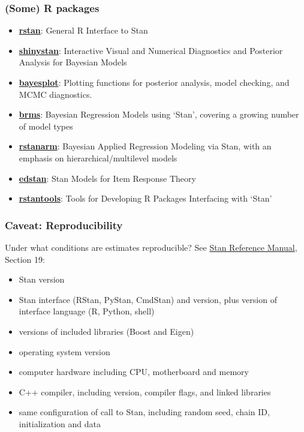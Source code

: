\documentclass[
  11pt,
]{article}
\providecommand{\tightlist}{%
  \setlength{\itemsep}{0pt}\setlength{\parskip}{0pt}}
\begin{document}
\hypertarget{some-r-packages}{%
\subsubsection{(Some) R packages}\label{some-r-packages}}

\begin{itemize}
\tightlist
\item
  \href{https://cran.r-project.org/package=rstan}{\textbf{rstan}}: General R Interface to Stan
\item
  \href{https://cran.r-project.org/package=shinystan}{\textbf{shinystan}}: Interactive Visual and Numerical Diagnostics and Posterior Analysis for Bayesian Models
\item
  \href{https://cran.r-project.org/web/packages/bayesplot/index.html}{\textbf{bayesplot}}: Plotting functions for posterior analysis, model checking, and MCMC diagnostics.
\item
  \href{https://cran.r-project.org/package=brms}{\textbf{brms}}: Bayesian Regression Models using `Stan', covering a growing number of model types
\item
  \href{https://cran.r-project.org/package=rstanarm}{\textbf{rstanarm}}: Bayesian Applied Regression Modeling via Stan, with an emphasis on hierarchical/multilevel models
\item
  \href{https://cran.r-project.org/package=edstan}{\textbf{edstan}}: Stan Models for Item Response Theory
\item
  \href{https://cran.r-project.org/package=rstantools}{\textbf{rstantools}}: Tools for Developing R Packages Interfacing with `Stan'
\end{itemize}

\hypertarget{caveat-reproducibility}{%
\subsubsection{Caveat: Reproducibility}\label{caveat-reproducibility}}

Under what conditions are estimates reproducible? See \href{https://mc-stan.org/docs/2_19/reference-manual/reproducibility-chapter.html}{Stan Reference Manual}, Section 19:

\begin{itemize}
\tightlist
\item
  Stan version
\item
  Stan interface (RStan, PyStan, CmdStan) and version, plus version of interface language (R, Python, shell)
\item
  versions of included libraries (Boost and Eigen)
\item
  operating system version
\item
  computer hardware including CPU, motherboard and memory
\item
  C++ compiler, including version, compiler flags, and linked libraries
\item
  same configuration of call to Stan, including random seed, chain ID, initialization and data
\end{itemize}
\end{document}
